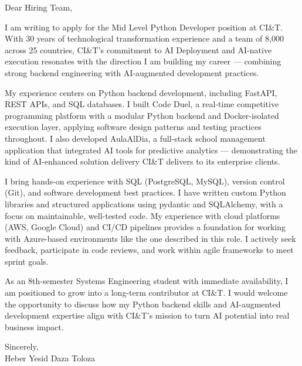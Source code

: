 \documentclass{cover}
\begin{document}
\makeheader
\makesubject

\begin{coverbody}
Dear Hiring Team,

I am writing to apply for the Mid Level Python Developer position at CI\&T. With 30 years of technological transformation experience and a team of 8,000 across 25 countries, CI\&T's commitment to AI Deployment and AI-native execution resonates with the direction I am building my career --- combining strong backend engineering with AI-augmented development practices.

My experience centers on Python backend development, including FastAPI, REST APIs, and SQL databases. I built Code Duel, a real-time competitive programming platform with a modular Python backend and Docker-isolated execution layer, applying software design patterns and testing practices throughout. I also developed AulaAlDia, a full-stack school management application that integrated AI tools for predictive analytics --- demonstrating the kind of AI-enhanced solution delivery CI\&T delivers to its enterprise clients.

I bring hands-on experience with SQL (PostgreSQL, MySQL), version control (Git), and software development best practices. I have written custom Python libraries and structured applications using pydantic and SQLAlchemy, with a focus on maintainable, well-tested code. My experience with cloud platforms (AWS, Google Cloud) and CI/CD pipelines provides a foundation for working with Azure-based environments like the one described in this role. I actively seek feedback, participate in code reviews, and work within agile frameworks to meet sprint goals.

As an 8th-semester Systems Engineering student with immediate availability, I am positioned to grow into a long-term contributor at CI\&T. I would welcome the opportunity to discuss how my Python backend skills and AI-augmented development expertise align with CI\&T's mission to turn AI potential into real business impact.

Sincerely,\\[1em]
Heber Yesid Daza Toloza
\end{coverbody}
\end{document}
